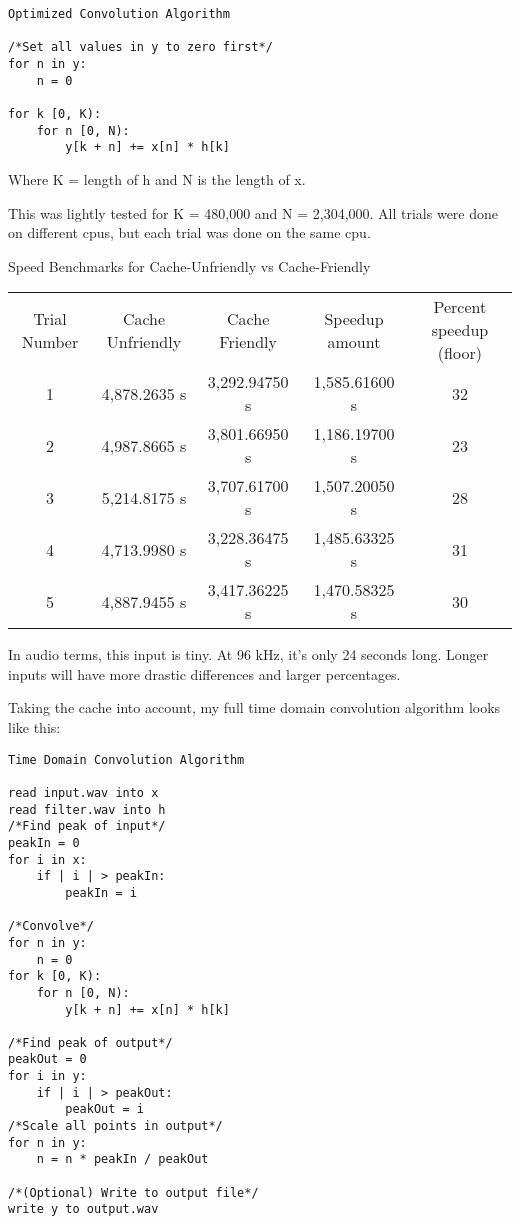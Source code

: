 \begin{verbatim}
Optimized Convolution Algorithm

/*Set all values in y to zero first*/
for n in y:
    n = 0
    
for k [0, K):
    for n [0, N):
        y[k + n] += x[n] * h[k]
\end{verbatim}
Where K = length of h and N is the length of x.

\noindent This was lightly tested for K = 480,000 and N = 2,304,000. All trials were done on different \gls{cpu}s, but each trial was done on the same \gls{cpu}. 

\begin{center}
Speed Benchmarks for Cache-Unfriendly vs Cache-Friendly
\begin{tabular}{ c c c c c }
 Trial Number & Cache Unfriendly & Cache Friendly & Speedup amount & Percent speedup (floor)\\ 
 1 & 4,878.2635 s & 3,292.94750 s & 1,585.61600 s & 32 \\  
 2 & 4,987.8665 s & 3,801.66950 s & 1,186.19700 s & 23 \\
 3 & 5,214.8175 s & 3,707.61700 s & 1,507.20050 s & 28 \\
 4 & 4,713.9980 s & 3,228.36475 s & 1,485.63325 s & 31 \\
 5 & 4,887.9455 s & 3,417.36225 s & 1,470.58325 s & 30
\end{tabular}
\end{center}

In audio terms, this input is tiny. At 96 kHz, it's only 24 seconds long. Longer inputs will have more drastic differences and larger percentages.

Taking the cache into account, my full time domain convolution algorithm looks like this:

\begin{verbatim}
Time Domain Convolution Algorithm

read input.wav into x
read filter.wav into h
/*Find peak of input*/
peakIn = 0
for i in x:
    if | i | > peakIn:
        peakIn = i
        
/*Convolve*/
for n in y:
    n = 0
for k [0, K):
    for n [0, N):
        y[k + n] += x[n] * h[k]
        
/*Find peak of output*/
peakOut = 0
for i in y:
    if | i | > peakOut:
        peakOut = i
/*Scale all points in output*/
for n in y:
    n = n * peakIn / peakOut

/*(Optional) Write to output file*/
write y to output.wav
\end{verbatim}

